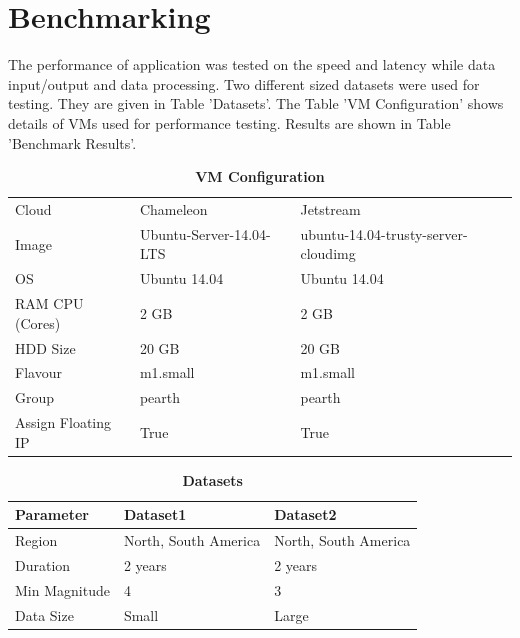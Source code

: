 \documentclass[9pt,twocolumn,twoside]{../../styles/osajnl}
\begin{document}
\section{Benchmarking}

The performance of application was tested on the speed and latency while data input/output and data processing. Two different sized datasets were used for testing. They are given in Table 'Datasets'. The Table 'VM Configuration' shows details of VMs used for performance testing. Results are shown in Table 'Benchmark Results'.
 

\begin{table}[htbp]
  
\caption{\bf VM Configuration}
\begin{tabular}{ m{5em} m{2.25cm} m{2.25cm} } 
\hline
Cloud & Chameleon & Jetstream \\ 
Image & Ubuntu-Server-14.04-LTS & ubuntu-14.04-trusty-server-cloudimg \\ 
OS & Ubuntu 14.04 & Ubuntu 14.04 \\ 
RAM CPU (Cores) & 2 GB & 2 GB \\ 
HDD Size & 20 GB & 20 GB \\ 
Flavour & m1.small & m1.small \\ 
Group & pearth & pearth \\ 
Assign Floating IP & True & True \\ 

\hline
\end{tabular}
\end{table} 

\begin{table}[htbp]
\caption{\bf Datasets}
\begin{tabular}{ m{5em} m{2cm} m{2cm} } 
\hline
Parameter & Dataset1 & Dataset2 \\ 
\hline
Region & North, South America & North, South America \\ 
Duration & 2 years & 2 years \\ 
Min Magnitude & 4 & 3 \\ 
Data Size & Small & Large \\ 

\hline
\end{tabular}
\end{table} 
\end{document}
